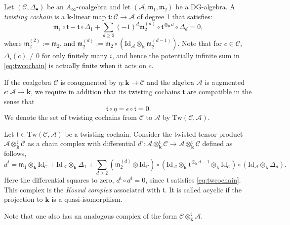 \documentclass{gtpart}
\renewcommand{\k}{\mathbf{k}}
\newcommand{\m}{\mathfrak{m}}
\renewcommand{\t}{\mathfrak{t}}
\newcommand{\A}{\mathscr{A}}
\renewcommand{\C}{\mathscr{C}}
\begin{document}
Let $(\mathscr{C}, \Delta_{\bullet})$ be an $A_\infty$-coalgebra and let $(\mathscr{A},
\m_1, \m_2)$ be a DG-algebra. A \emph{twisting cochain} is a $\k$-linear map $\mathfrak{t}\colon
\mathscr{C} \to \mathscr{A}$ of degree 1 that satisfies:
\begin{equation}\label{eq:twcochain}
    \m_1 \circ \mathfrak{t} - \mathfrak{t} \circ \Delta_1 + \sum_{d \geq 2} (-1)^d \m_2^{(d)}
\circ \mathfrak{t}^{\otimes_\k d} \circ \Delta_d = 0, 
\end{equation}
where $\m_2^{(2)} := \m_2$, and $\m_2^{(d)} := \m_2\circ
(\mathrm{Id}_\mathscr{A} \otimes_\k \m_2^{(d-1)})$. Note that for
$c \in \mathscr{C}$, $\Delta_i(c) \neq 0$ for only finitely many $i$, and hence the potentially infinite sum in \eqref{eq:twcochain} is actually finite when it acts on $c$.

If the coalgebra $\C$ is coaugmented by $\eta\colon \k \to \C$ and the algebra $\A$ is augmented
$\epsilon\colon \A \to \k$, we require in addition that its  twisting cochains $\t$ are compatible in the sense that  \begin{equation}
\t \circ \eta = \epsilon \circ \t =0.
\end{equation}
We denote the set of twisting cochains from $\C$ to $\A$ by $\mathrm{Tw}(\C,\A)$. 


Let $\t\in\mathrm{Tw}(\C,\A)$ be a twisting cochain. Consider the twisted tensor product $\A
\otimes^\mathfrak{t}_\k \C$ as a chain complex with 
differential $d^{\mathfrak{t}}\colon \A\otimes^\mathfrak{t}_\k \C\to\A\otimes^\mathfrak{t}_\k \C$ defined as follows,
\begin{equation}\label{koszulcomplex} 
d^\mathfrak{t} = \m_1 \otimes_\k \mathrm{Id}_\C + \mathrm{Id}_\A \otimes_\k \Delta_1 +
\sum_{d \geq 2} (\m_2^{(d)} \otimes \mathrm{Id}_\C) \circ (\mathrm{Id}_\A \otimes_\k
\mathfrak{t}^{\otimes_{\k} d-1}
\otimes_\k \mathrm{Id}_\C ) \circ (\mathrm{Id}_\A \otimes_\k \Delta_{d}). 
\end{equation}
Here the differential squares to zero, $d^\mathfrak{t} \circ d^\mathfrak{t}=0$, since
$\mathfrak{t}$ satisfies \eqref{eq:twcochain}. This complex is the \emph{Koszul complex}
associated with $\t$. It is called acyclic if the projection to $\k$ is a quasi-isomorphism. 

Note that one also has an analogous complex of the form $\C
\otimes_{\k}^{\t} \A$.  
\end{document}
